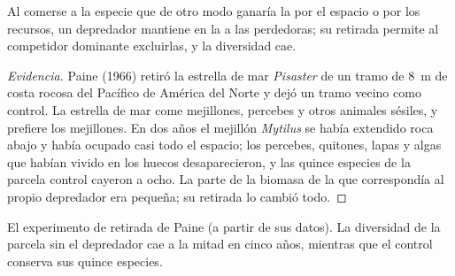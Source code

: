\begin{proposition}\label{prop:b1:species-interactions:paine}
Al comerse a la especie que de otro modo ganaría la  por el
espacio o por los recursos, un depredador mantiene en la  a las
perdedoras; su retirada permite al competidor dominante excluirlas, y la
diversidad cae.
\end{proposition}
\begin{proof}[Evidencia]
Paine (1966) retiró la estrella de mar \emph{Pisaster} de un tramo de
\qty{8}{m} de costa rocosa del Pacífico de América del Norte y dejó un tramo
vecino como control. La estrella de mar come mejillones, percebes y otros
animales sésiles, y prefiere los mejillones. En dos años el mejillón
\emph{Mytilus} se había extendido roca abajo y había ocupado casi todo el
espacio; los percebes, quitones, lapas y algas que habían vivido en los
huecos desaparecieron, y las quince especies de la parcela control cayeron a
ocho. La parte de la biomasa de la  que correspondía al propio
depredador era pequeña; su retirada lo cambió todo.
\end{proof}

\begin{omfigure}

{\small El experimento de retirada de Paine (a partir de sus datos). La
diversidad de la parcela sin el depredador cae a la mitad en cinco años,
mientras que el control conserva sus quince especies.}
\end{omfigure}

